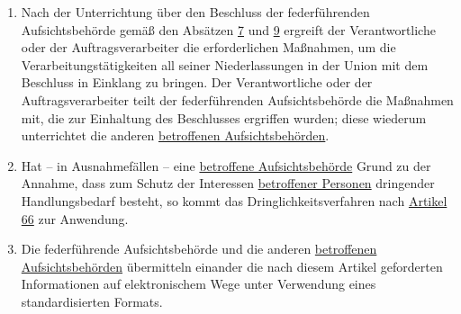 \begin{enumerate}
  \item Nach der Unterrichtung über den Beschluss der federführenden Aufsichtsbehörde gemäß den Absätzen \hyperref
   [itm:60-7]{7} und \hyperref[itm:60-9]{9} ergreift der Verantwortliche oder der Auftragsverarbeiter die
   erforderlichen Maßnahmen, um die Verarbeitungstätigkeiten all seiner Niederlassungen in der Union mit dem Beschluss
   in Einklang zu bringen. Der Verantwortliche oder der Auftragsverarbeiter teilt der federführenden Aufsichtsbehörde
   die Maßnahmen mit, die zur Einhaltung des Beschlusses ergriffen wurden; diese wiederum unterrichtet die anderen
   \hyperref[itm:04-22]{betroffenen Aufsichtsbehörden}.
  \label{itm:60-10}

  \item Hat -- in Ausnahmefällen -- eine \hyperref[itm:04-22]{betroffene Aufsichtsbehörde} Grund zu der Annahme, dass zum Schutz der
   Interessen \hyperref[itm:04-1]{betroffener Personen} dringender Handlungsbedarf besteht, so kommt das Dringlichkeitsverfahren nach
   \hyperref[ch:66]{Artikel 66} zur Anwendung.
  \label{itm:60-11}

  \item Die federführende Aufsichtsbehörde und die anderen \hyperref[itm:04-22]{betroffenen Aufsichtsbehörden} übermitteln einander die nach
   diesem Artikel geforderten Informationen auf elektronischem Wege unter Verwendung eines standardisierten Formats.
  \label{itm:60-12}

\end{enumerate}


